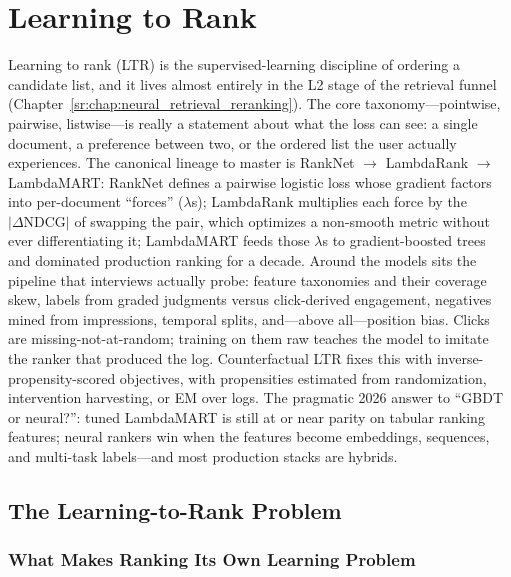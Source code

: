 \chapter{Learning to Rank}
\label{sr:chap:learning_to_rank}

\begin{tldr}
Learning to rank (LTR) is the supervised-learning discipline of ordering a candidate list, and it lives almost entirely in the L2 stage of the retrieval funnel (Chapter~\ref{sr:chap:neural_retrieval_reranking}). The core taxonomy---pointwise, pairwise, listwise---is really a statement about what the loss can see: a single document, a preference between two, or the ordered list the user actually experiences. The canonical lineage to master is RankNet $\rightarrow$ LambdaRank $\rightarrow$ LambdaMART: RankNet defines a pairwise logistic loss whose gradient factors into per-document ``forces'' ($\lambda$s); LambdaRank multiplies each force by the $|\Delta \text{NDCG}|$ of swapping the pair, which optimizes a non-smooth metric without ever differentiating it; LambdaMART feeds those $\lambda$s to gradient-boosted trees and dominated production ranking for a decade. Around the models sits the pipeline that interviews actually probe: feature taxonomies and their coverage skew, labels from graded judgments versus click-derived engagement, negatives mined from impressions, temporal splits, and---above all---position bias. Clicks are missing-not-at-random; training on them raw teaches the model to imitate the ranker that produced the log. Counterfactual LTR fixes this with inverse-propensity-scored objectives, with propensities estimated from randomization, intervention harvesting, or EM over logs. The pragmatic 2026 answer to ``GBDT or neural?'': tuned LambdaMART is still at or near parity on tabular ranking features; neural rankers win when the features become embeddings, sequences, and multi-task labels---and most production stacks are hybrids.
\end{tldr}

\section{The Learning-to-Rank Problem}
\label{sr:sec:ltr_problem}

\subsection{What Makes Ranking Its Own Learning Problem}

